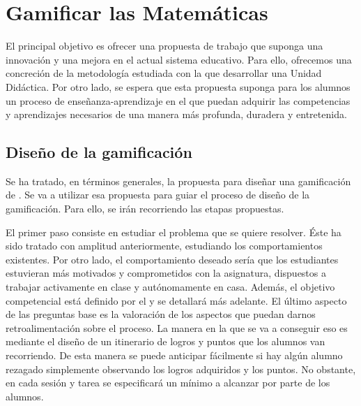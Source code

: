 


\chapter{Gamificar las Matemáticas}




El principal objetivo es ofrecer una propuesta de trabajo que suponga una innovación y una mejora en el actual sistema educativo.
%
Para ello, ofrecemos una concreción de la metodología estudiada con la que desarrollar una Unidad Didáctica.
% 
Por otro lado, se espera que esta propuesta suponga para los alumnos un proceso de enseñanza-aprendizaje en el que puedan adquirir las competencias y aprendizajes necesarios de una manera más profunda, duradera y entretenida.


\section{Diseño de la gamificación}

Se ha tratado, en términos generales, la propuesta para diseñar una gamificación de \cite{kapp2013gamification}. 
%
Se va a utilizar esa propuesta para guiar el proceso de diseño de la gamificación. 
%
Para ello, se irán recorriendo las etapas propuestas.

El primer paso consiste en estudiar el problema que se quiere resolver. 
%
Éste ha sido tratado con amplitud anteriormente, estudiando los comportamientos existentes. 
%
Por otro lado, el comportamiento deseado sería que los estudiantes estuvieran más motivados y comprometidos con la asignatura, dispuestos a trabajar activamente en clase y autónomamente en casa.
%
Además, el objetivo competencial está definido por el \bocm y se detallará más adelante.
%
El último aspecto de las preguntas base es la valoración de los aspectos que puedan darnos retroalimentación sobre el proceso.
%
La manera en la que se va a conseguir eso es mediante el diseño de un itinerario de logros y puntos que los alumnos van recorriendo.
%
De esta manera se puede anticipar fácilmente si hay algún alumno rezagado simplemente observando los logros adquiridos y los puntos.
%
No obstante, en cada sesión y tarea se especificará un mínimo a alcanzar por parte de los alumnos.

